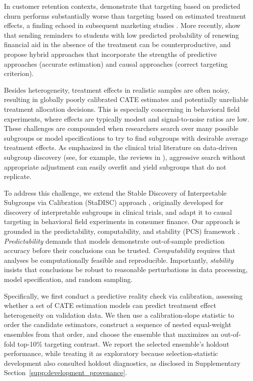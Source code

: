 \documentclass[12pt]{article}
\newcommand{\TargetFrac}{10{\%}\xspace}
\begin{document}
In customer retention contexts, \cite{ascarza2018} demonstrate that targeting based on predicted churn performs substantially worse than targeting based on estimated treatment effects, a finding echoed in subsequent marketing studies \citep{fernandez2022}. More recently, \cite{athey2025} show that sending reminders to students with low predicted probability of renewing financial aid in the absence of the treatment can be counterproductive, and propose hybrid approaches that incorporate the strengths of predictive approaches (accurate estimation) and causal approaches (correct targeting criterion).

Besides heterogeneity, treatment effects in realistic samples are often noisy, resulting in globally poorly calibrated CATE estimates and potentially unreliable treatment allocation decisions. This is especially concerning in behavioral field experiments, where effects are typically modest and signal-to-noise ratios are low. These challenges are compounded when researchers search over many possible subgroups or model specifications to try to find subgroups with desirable average treatment effects. As emphasized in the clinical trial literature on data-driven subgroup discovery (see, for example, the reviews in \citealp{ondra2016methods,huber2019comparison}), aggressive search without appropriate adjustment can easily overfit and yield subgroups that do not replicate.

To address this challenge, we extend the Stable Discovery of Interpretable Subgroups via Calibration (StaDISC) approach \citep{dwivedi2020}, originally developed for discovery of interpretable subgroups in clinical trials, and adapt it to causal targeting in behavioral field experiments in consumer finance. Our approach is grounded in the predictability, computability, and stability (PCS) framework \citep{yu2018,yu2020}. \emph{Predictability} demands that models demonstrate out-of-sample prediction accuracy before their conclusions can be trusted. \emph{Computability} requires that analyses be computationally feasible and reproducible. Importantly, \emph{stability} insists that conclusions be robust to reasonable perturbations in data processing, model specification, and random sampling.

Specifically, we first conduct a predictive reality check via calibration, assessing whether a set of CATE estimation models can predict treatment effect heterogeneity on validation data. We then use a calibration-slope statistic to order the candidate estimators, construct a sequence of nested equal-weight ensembles from that order, and choose the ensemble that maximizes an out-of-fold top-\TargetFrac targeting contrast. We report the selected ensemble's holdout performance, while treating it as exploratory because selection-statistic development also consulted holdout diagnostics, as disclosed in Supplementary Section~\ref{supp:development_provenance}.
\end{document}
